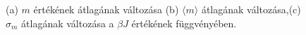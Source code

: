\documentclass[12pt]{article}
\begin{document}
\begin{figure}[H]
\centering     
{}

\caption{(a) $m$ értékének átlagának változása (b) $\langle m\rangle$ átlagának változása,(c) $\sigma_m$ átlagának változása a $\beta J$ értékének függvényében.}
\label{fig: k}
\end{figure}
\end{document}
